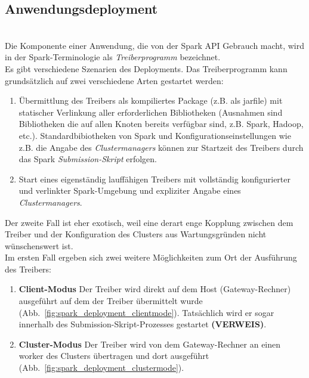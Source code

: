 \subsection{Anwendungsdeployment}\\

Die Komponente einer Anwendung, die von der Spark API Gebrauch macht, wird in der Spark-Terminologie als \textit{Treiberprogramm} bezeichnet. \\

Es gibt verschiedene Szenarien des Deployments. Das Treiberprogramm kann grundsätzlich auf zwei verschiedene Arten gestartet werden:\\

\begin{enumerate}
	\item Übermittlung des Treibers als kompiliertes Package (z.B. als \gls{jarfile}) mit statischer Verlinkung aller erforderlichen Bibliotheken (Ausnahmen sind Bibliotheken die auf allen Knoten bereits verfügbar sind, z.B. Spark, Hadoop, etc.). Standardbibiotheken von Spark und Konfigurationseinstellungen wie z.B. die Angabe des \textit{Clustermanagers} können zur Startzeit des Treibers durch das Spark \textit{Submission-Skript} erfolgen.
	\item Start eines eigenständig lauffähigen Treibers mit vollständig konfigurierter und verlinkter Spark-Umgebung und expliziter Angabe eines \textit{Clustermanagers}.
\end{enumerate}

Der zweite Fall ist eher exotisch, weil eine derart enge Kopplung zwischen dem Treiber und der Konfiguration des Clusters aus Wartungsgründen nicht wünschenswert ist.\\

Im ersten Fall ergeben sich zwei weitere Möglichkeiten zum Ort der Ausführung des Treibers:\\

\begin{enumerate}
	\item \textbf{Client-Modus}
	Der Treiber wird direkt auf dem Host (Gateway-Rechner) ausgeführt auf dem der Treiber übermittelt wurde (Abb.~\ref{fig:spark_deployment_clientmode}). Tatsächlich wird er sogar innerhalb des Submission-Skript-Prozesses gestartet \textbf{(VERWEIS)}.
	\item \textbf{Cluster-Modus}
	Der Treiber wird von dem Gateway-Rechner an einen \gls{worker} des Clusters übertragen und dort ausgeführt (Abb.~\ref{fig:spark_deployment_clustermode}).
\end{enumerate}\\

